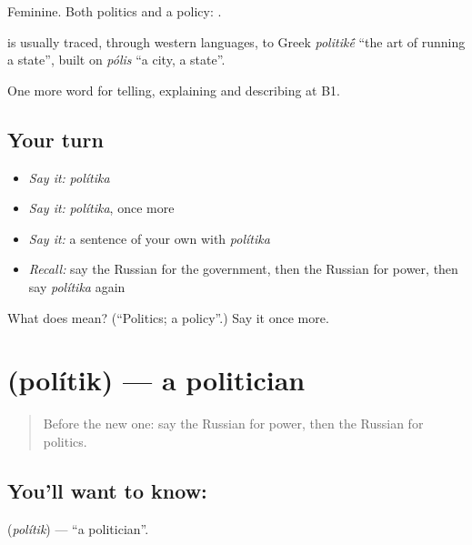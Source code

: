 Feminine. Both politics and a policy: \emph{ }.

\begin{cousinweb}
\textbf{} is usually traced, through western languages, to Greek \emph{politik\'{\={e}}} \textquotedblleft{}the art of running a state\textquotedblright{}, built on \emph{pólis} \textquotedblleft{}a city, a state\textquotedblright{}.
\end{cousinweb}

\begin{grammarlens}[title={What you've built}]
One more word for telling, explaining and describing at B1.
\end{grammarlens}

\subsection*{Your turn}
\begin{itemize}
\raggedright
  \item \emph{Say it:} \emph{polítika}
  \item \emph{Say it:} \emph{polítika}, once more
  \item \emph{Say it:} a sentence of your own with \emph{polítika}
  \item \emph{Recall:} say the Russian for the government, then the Russian for power, then say \emph{polítika} again
\end{itemize}

\begin{tcolorbox}[breakable,colback=teal!4,colframe=teal!35!black,title={Before you move on}]
What does  mean? (\textquotedblleft{}Politics; a policy\textquotedblright{}.) Say it once more.
\end{tcolorbox}
\section[\texorpdfstring{\ru{политик} (polítik)}{политик (polítik)}]{ (polítik) — a politician}

\label{lesson:RU-C365-politik}



\begin{quote}
Before the new one: say the Russian for power, then the Russian for politics.
\end{quote}

\subsection*{You'll want to know: }
\textbf{} (\emph{polítik}) — \textquotedblleft{}a politician\textquotedblright{}.


